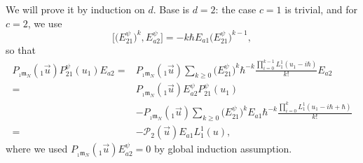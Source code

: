 \documentclass[10pt,a4paper]{article}
\numberwithin{equation}{section}
\newcommand{\calP}{\mathcal{P}}
\newcommand{\m}{\mathfrak{m}}
\begin{document}
	We will prove it by induction on $d$. Base is $d=2$: the case $c=1$ is trivial, and for $c=2$, we use
	\[
	\bigl[\bigl(E_{21}^{\psi}\bigr)^k,E_{a2}^{\psi}\bigr] = -k\hbar E_{a1} \bigl(E_{21}^{\psi}\bigr)^{k-1},
	\]
	so that
	\begin{align*}
		P_{{}_1\m_N}({}_1\vec{u}) P_{21}^{\psi}(u_1) E_{a2}
		={}& P_{{}_1\m_N}({}_1\vec{u})\sum\limits_{k\geq 0} \bigl(E_{21}^{\psi}\bigr)^k \hbar^{-k} \frac{\prod_{i=0}^{k-1} L_1^1(u_1 - i\hbar)}{k!} E_{a2} \\
		={}&P_{{}_1\m_N}({}_1\vec{u}) E_{a2}^{\psi} P_{21}^{\psi}(u_1) \\
		&- P_{{}_1\m_N}({}_1\vec{u}) \sum\limits_{k\geq 0} \bigl(E_{21}^{\psi}\bigr)^k E_{a1} \hbar^{-k} \frac{\prod_{i=0}^{k}L_1^1(u_1 - i\hbar + \hbar)}{k!} \\
		={}& -\calP_2(\vec{u}) E_{a1} L_1^1(u),
	\end{align*}
	where we used $P_{{}_1\m_N}({}_1\vec{u}) E_{a2}^{\psi} = 0$ by global induction assumption.
	
\end{document}
